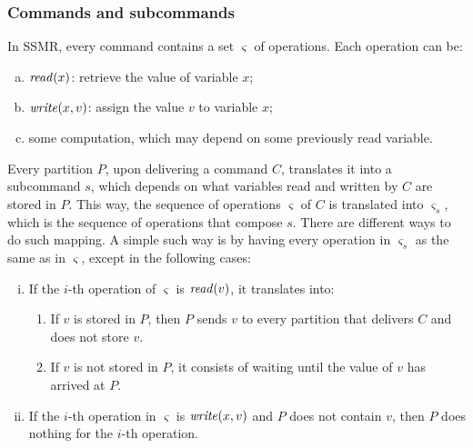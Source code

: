 \documentclass{usiinftr}
\begin{document}
\subsubsection{Commands and subcommands}

In SSMR, every command contains a set $\varsigma$ of operations. Each operation can be:

\begin{enumerate}[a)]

\item $\text{\textit{read}}(x)$: retrieve the value of variable $x$;

\item $\text{\textit{write}}(x, v)$: assign the value $v$ to variable $x$;

\item some computation, which may depend on some previously read variable.

\end{enumerate}

Every partition $P$, upon delivering a command $C$, translates it into a subcommand $s$, which depends on what variables read and written by $C$ are stored in $P$. This way, the sequence of operations $\varsigma$ of $C$ is translated into $\varsigma_s$, which is the sequence of operations that compose $s$. There are different ways to do such mapping. A simple such way is by having every operation in $\varsigma_s$ as the same as in $\varsigma$, except in the following cases:

\begin{enumerate}[i)]

\item If the $i$-th operation of $\varsigma$ is $\text{\textit{read}}(v)$, it translates into:

\begin{enumerate}

\item If $v$ is stored in $P$, then $P$ sends $v$ to every partition that delivers $C$ and does not store $v$.

\item If $v$ is not stored in $P$, it consists of waiting until the value of $v$ has arrived at $P$.

\end{enumerate}

\item If the $i$-th operation in $\varsigma$ is $\text{\textit{write}}(x,v)$ and $P$ does not contain $v$, then $P$ does nothing for the $i$-th operation.

\end{enumerate}
\end{document}
